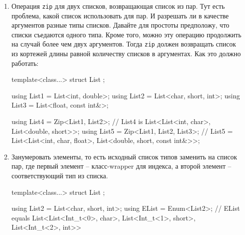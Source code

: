 \begin{enumerate}
\begin{cppcode}
using List4 = Foldl<Merge2, List<>, BigList>;
// List4 is List<int, double, char>
\end{cppcode}
Здесь \verb"List<>" выступает в качестве начального элемента.
Математически \verb"foldl" и \verb"foldr" отличаются расстановкой скобок.
На примере объединения множеств $U_1,\ldots, U_k$ с начальным множеством $U_0$, это выглядит так:
\[
\begin{aligned}
\operatorname{foldl}(\cup, U_0, \{U_1,\ldots, U_k\}) &=(\ldots ((U_0 \cup U_1)\cup U_2) \ldots U_{k-1}) \cup U_k)\\
\operatorname{foldr}(\cup, \{U_1,\ldots, U_k\}, U_0) &=
(U_1 \cup (U_2 \ldots (U_{k-1}\cup (U_k \cup U_0))\ldots)
\end{aligned}
\]
Есть разновидность \verb"foldl0" и \verb"foldr0", которым не нужен начальный элемент, но они предполагают, что список аргументов содержит хотя бы один элемент.

\item Операция \verb"zip" для двух списков, возвращающая список из пар.
Тут есть проблема, какой список использовать для пар.
И разрешать ли в качестве аргументов разные типы списков.
Давайте для простоты предположу, что списки съедаются одного типа.
Кроме того, можно эту операцию продолжить на случай более чем двух аргументов.
Тогда \verb"zip" должен возвращать список из кортежей длины равной количеству списков в аргументах.
Как это должно работать:
\begin{cppcode}
template<class...>
struct List {};

using List1 = List<int, double>;
using List2 = List<char, short, int>;
using List3 = List<float, const int&>;

using List4 = Zip<List1, List2>;
// List4 is List<List<int, char>, List<double, short>>;
using List5 = Zip<List1, List2, List3>;
// List5 = List<List<int, char, float>, List<double, short, const int&>>;
\end{cppcode}

\item Занумеровать элементы, то есть исходный список типов заменить на список пар, где первый элемент -- класс-wrapper для индекса, а второй элемент -- соответствующий тип из списка.
\begin{cppcode}
template<class...>
struct List {};

using List2 = List<char, short, int>;
using EList = Enum<List2>;
// EList equals List<List<Int_t<0>, char>, List<Int_t<1>, short>, List<Int_t<2>, int>>
\end{cppcode}


\end{enumerate}
